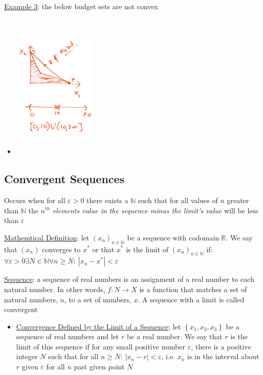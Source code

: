 \documentclass{article}
\begin{document}
  \par
  \underline{Example 3}: the below budget sets are not convex
  \begin{itemize}
    \item  \includegraphics[width=4cm, height=7cm]{pic15}
  \end{itemize}
  \par
\vspace{6mm}
\subsection{Convergent Sequences}
Occurs when for all $\varepsilon > 0$ there exists a $\mathbb{N}$ such that for all values of $n$ greater than $\mathbb{N}$ the $n^{th}$ \textit{elements value in the sequence minus the limit's value} will be less than $\varepsilon$ \par \vspace{0.3em}
  \underline{Mathemtical Definition}: let $(x_{n})_{n \in \mathbb{N}}$ be a sequence with codomain $\mathbb{R}$. We say that $(x_{n})$ converges to $x^{*}$ or that $x^{*}$ is the limit of $(x_{n})_{n \in \mathbb{N}}$ if: $\forall \varepsilon > 0 \exists N \in \mathbb{N} \forall n \geq N: \ |x_{n} - x^{*}| < \varepsilon$ \par
  \underline{Sequence}: a sequence of real numbers is an assignment of a real number to each natural number. In other words, $f: N \rightarrow X$ is a function that matches a set of natural numbers, $n$, to a set of numbers, $x$. A sequence with a limit is called convergent
  \begin{itemize}
    \item  \underline{Convergence Defined by the Limit of a Sequence}: let $\left\{ x_{1}, x_{2}, x_{3} \right\}$  be a sequence of real numbers and let $r$ be a real number. We say that $r$ is the limit of this sequence if for any small positive number $\varepsilon$, there is a positive integer $N$ such that for all $n \geq N: \ |x_{n} - r| < \varepsilon$, i.e. $x_{n}$ is in the interval about $r$ given $\varepsilon$ for all $n$ past given point $N$
  \end{itemize}
  \par
\vspace{6mm}
\end{document}
